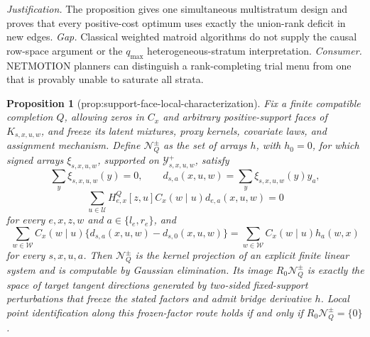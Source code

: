 \documentclass{article}
\newtheorem{proposition}{Proposition}
\begin{document}
\par\smallskip\noindent \textit{Justification.} The proposition gives one simultaneous multistratum design and proves that every positive-cost optimum uses exactly the union-rank deficit in new edges. \textit{Gap.} Classical weighted matroid algorithms do not supply the causal row-space argument or the \(q_{\max}\) heterogeneous-stratum interpretation. \textit{Consumer.} NETMOTION planners can distinguish a rank-completing trial menu from one that is provably unable to saturate all strata.

\begin{proposition}[prop:support-face-local-characterization]\label{prop:support-face-local-characterization}
Fix a finite compatible completion \(Q\), allowing zeros in \(C_x\) and arbitrary positive-support faces of \(K_{s,x,u,w}\), and freeze its latent mixtures, proxy kernels, covariate laws, and assignment mechanism.  Define \(\mathcal N_Q^{\pm}\) as the set of arrays \(h\), with \(h_0=0\), for which signed arrays \(\xi_{s,x,u,w}\), supported on \(\mathcal Y^+_{s,x,u,w}\), satisfy
\[
\sum_y\xi_{s,x,u,w}(y)=0,
\qquad
d_{s,a}(x,u,w)=\sum_y\xi_{s,x,u,w}(y)y_a,
\]
\[
\sum_{u\in\mathcal U}H^Q_{e,x}[z,u]C_x(w\mid u)d_{e,a}(x,u,w)=0
\]
for every \(e,x,z,w\) and \(a\in\{l_e,r_e\}\), and
\[
\sum_{w\in\mathcal W}C_x(w\mid u)
\{d_{s,a}(x,u,w)-d_{s,0}(x,u,w)\}
=\sum_{w\in\mathcal W}C_x(w\mid u)h_a(w,x)
\]
for every \(s,x,u,a\).  Then \(\mathcal N_Q^{\pm}\) is the kernel projection of an explicit finite linear system and is computable by Gaussian elimination.  Its image \(R_0\mathcal N_Q^{\pm}\) is exactly the space of target tangent directions generated by two-sided fixed-support perturbations that freeze the stated factors and admit bridge derivative \(h\).  Local point identification along this frozen-factor route holds if and only if \(R_0\mathcal N_Q^{\pm}=\{0\}\).
\end{proposition}
\end{document}
